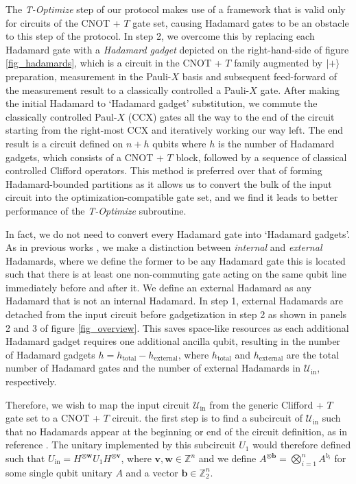 \documentclass[notitlepage]{article}
\theoremstyle{definition}
\theoremstyle{problem}
\theoremstyle{lemma}
\begin{document}
The \emph{T-Optimize} step of our protocol makes use of a framework that is valid only for circuits of the CNOT + $T$ gate set, causing Hadamard gates to be an obstacle to this step of the protocol. In step 2, we overcome this by replacing each Hadamard gate with a \emph{Hadamard gadget} depicted on the right-hand-side of figure \ref{fig_hadamards}, which is a circuit in the CNOT + $T$ family augmented by $\left\vert{+}\right\rangle$ preparation, measurement in the Pauli-$X$ basis and subsequent feed-forward of the measurement result to a classically controlled a Pauli-$X$ gate. After making the initial Hadamard to `Hadamard gadget' substitution, we commute the classically controlled Paul-$X$ (CCX) gates all the way to the end of the circuit starting from the right-most CCX and iteratively working our way left. The end result is a circuit defined on $n+h$ qubits where $h$ is the number of Hadamard gadgets, which consists of a CNOT + $T$ block, followed by a sequence of classical controlled Clifford operators. This method is preferred over that of forming Hadamard-bounded partitions as it allows us to convert the bulk of the input circuit into the optimization-compatible gate set, and we find it leads to better performance of the \emph{T-Optimize} subroutine.



In fact, we do not need to convert every Hadamard gate into `Hadamard gadgets'. As in previous works \cite{1_Montanaro_2017}, we make a distinction between \emph{internal} and \emph{external} Hadamards, where we define the former to be any Hadamard gate this is located such that there is at least one non-commuting gate acting on the same qubit line immediately before and after it. We define an external Hadamard as any Hadamard that is not an internal Hadamard. In step 1, external Hadamards are detached from the input circuit before gadgetization in step 2 as shown in panels 2 and 3 of figure \ref{fig_overview}. This saves space-like resources as each additional Hadamard gadget requires one additional ancilla qubit, resulting in the number of Hadamard gadgets $h=h_{\text{total}}-h_{\text{external}}$, where $h_{\text{total}}$ and $h_{\text{external}}$ are the total number of Hadamard gates and the number of external Hadamards in $\mathcal{U}_{\text{in}}$, respectively.

 \iffalse Therefore, we wish to map the input circuit $\mathcal{U}_{\text{in}}$ from the generic Clifford + $T$ gate set to a CNOT + $T$ circuit. the first step is to find a subcircuit of $\mathcal{U}_{\text{in}}$ such that no Hadamards appear at the beginning or end of the circuit definition, as in reference \cite{1_Montanaro_2017}. The unitary implemented by this subcircuit $U_1$ would therefore defined such that $U_{\text{in}}=H^{\otimes\mathbf{w}}U_1H^{\otimes\mathbf{v}}$, where $\mathbf{v}, \mathbf{w}\in \mathbb{Z}^n$ and we define $A^{\otimes\mathbf{b}}=\bigotimes_{i=1}^n A^{b_i}$ for some single qubit unitary $A$ and a vector $\mathbf{b}\in\mathbb{Z}_2^n$.
\end{document}
